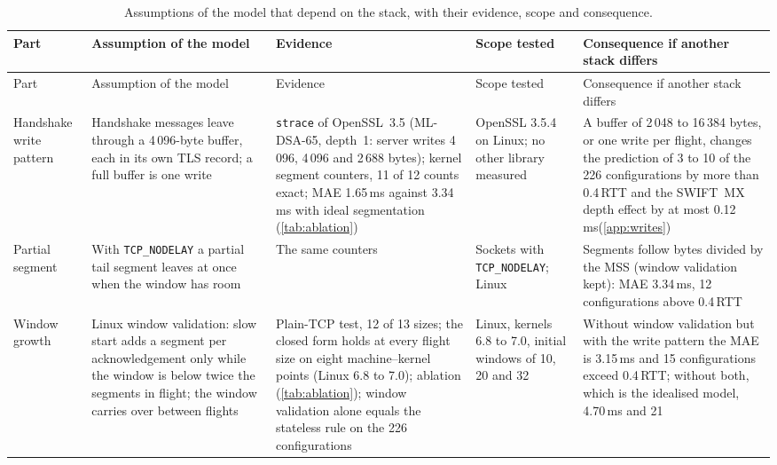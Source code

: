 \documentclass[preprint,12pt]{elsarticle}
\newcommand{\ms}{\,ms\xspace}
\begin{document}
\begin{footnotesize}\sloppy
\setlength{\tabcolsep}{3pt}\renewcommand{\arraystretch}{1.1}
\begin{longtable}{@{}>{\raggedright\arraybackslash}p{}>{\raggedright\arraybackslash}p{}>{\raggedright\arraybackslash}p{}>{\raggedright\arraybackslash}p{}>{\raggedright\arraybackslash}p{}@{}}
\caption{Assumptions of the model that depend on the stack, with their evidence, scope and consequence.}\label{tab:assump}\\
\toprule
Part & Assumption of the model & Evidence & Scope tested & Consequence if another stack differs \\
\midrule\endfirsthead
\toprule
Part & Assumption of the model & Evidence & Scope tested & Consequence if another stack differs \\
\midrule\endhead
\bottomrule\endlastfoot
Handshake write pattern & Handshake messages leave through a 4\,096-byte buffer, each in its own TLS record; a full buffer is one write & \texttt{strace} of OpenSSL~3.5 (ML-DSA-65, depth~1: server writes 4\,096, 4\,096 and 2\,688 bytes); kernel segment counters, 11 of 12 counts exact; MAE 1.65\ms against 3.34\ms with ideal segmentation (\cref{tab:ablation}) & OpenSSL 3.5.4 on Linux; no other library measured & A buffer of 2\,048 to 16\,384 bytes, or one write per flight, changes the prediction of 3 to 10 of the 226 configurations by more than 0.4\,RTT and the SWIFT~MX depth effect by at most 0.12\ms (\cref{app:writes}) \\
Partial segment & With \texttt{TCP\_\allowbreak NODELAY} a partial tail segment leaves at once when the window has room & The same counters & Sockets with \texttt{TCP\_\allowbreak NODELAY}; Linux & Segments follow bytes divided by the MSS (window validation kept): MAE 3.34\ms, 12 configurations above 0.4\,RTT \\
Window growth & Linux window validation: slow start adds a segment per acknowledgement only while the window is below twice the segments in flight; the window carries over between flights & Plain-TCP test, 12 of 13 sizes; the closed form holds at every flight size on eight machine--kernel points (Linux 6.8 to 7.0); ablation (\cref{tab:ablation}); window validation alone equals the stateless rule on the 226 configurations & Linux, kernels 6.8 to 7.0, initial windows of 10, 20 and 32 & Without window validation but with the write pattern the MAE is 3.15\ms and 15 configurations exceed 0.4\,RTT; without both, which is the idealised model, 4.70\ms and 21 \\

\end{longtable}
\end{footnotesize}
\end{document}
